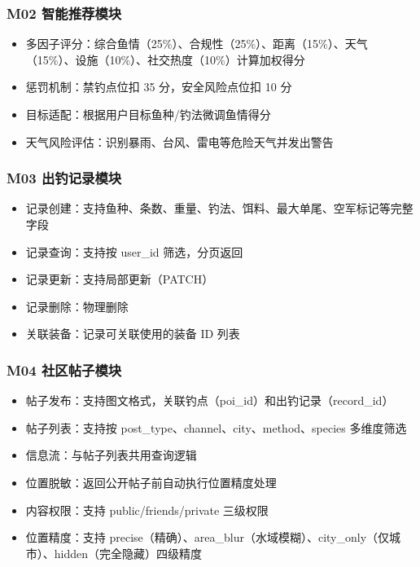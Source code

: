 \documentclass[12pt,a4paper]{ctexart}
\begin{document}
\subsubsection{M02 智能推荐模块}

\begin{itemize}
  \item 多因子评分：综合鱼情（25\%）、合规性（25\%）、距离（15\%）、天气（15\%）、设施（10\%）、社交热度（10\%）计算加权得分
  \item 惩罚机制：禁钓点位扣 35 分，安全风险点位扣 10 分
  \item 目标适配：根据用户目标鱼种/钓法微调鱼情得分
  \item 天气风险评估：识别暴雨、台风、雷电等危险天气并发出警告
\end{itemize}

\subsubsection{M03 出钓记录模块}

\begin{itemize}
  \item 记录创建：支持鱼种、条数、重量、钓法、饵料、最大单尾、空军标记等完整字段
  \item 记录查询：支持按 user\_id 筛选，分页返回
  \item 记录更新：支持局部更新（PATCH）
  \item 记录删除：物理删除
  \item 关联装备：记录可关联使用的装备 ID 列表
\end{itemize}

\newpage

\subsubsection{M04 社区帖子模块}

\begin{itemize}
  \item 帖子发布：支持图文格式，关联钓点（poi\_id）和出钓记录（record\_id）
  \item 帖子列表：支持按 post\_type、channel、city、method、species 多维度筛选
  \item 信息流：与帖子列表共用查询逻辑
  \item 位置脱敏：返回公开帖子前自动执行位置精度处理
  \item 内容权限：支持 public/friends/private 三级权限
  \item 位置精度：支持 precise（精确）、area\_blur（水域模糊）、city\_only（仅城市）、hidden（完全隐藏）四级精度
\end{itemize}
\end{document}
